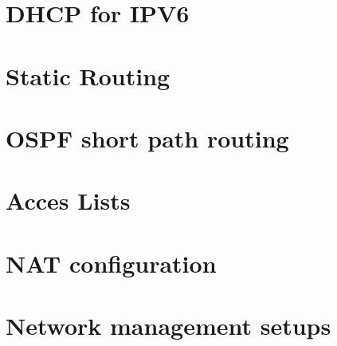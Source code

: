 \documentclass{article}
\begin{document}
\begin{landscape}
\section{DHCP for IPV6}

\clearpage

\section{Static Routing}


\section{OSPF short path routing}

\clearpage

\section{Acces Lists}

\clearpage

\section{NAT configuration}

\clearpage

\section{Network management setups}

\clearpage


\end{landscape}
\end{document}

